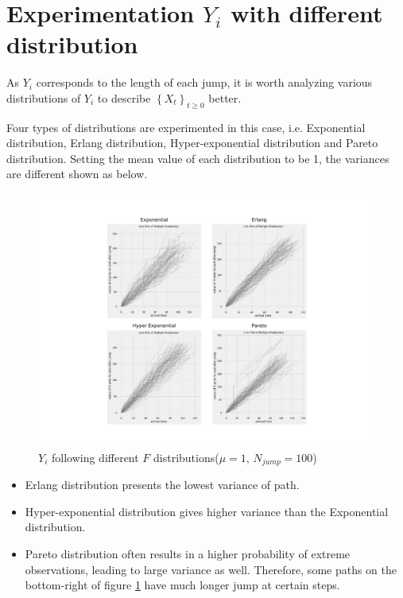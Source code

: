 \section{Experimentation $Y_i$ with different distribution}

As $Y_i$ corresponds to the length of each jump, it is worth analyzing various distributions of $Y_i$ to describe $\left\{X_{t}\right\}_{t \geq 0}$ better.

Four types of distributions are experimented in this case, i.e. Exponential distribution, Erlang distribution, Hyper-exponential distribution and Pareto distribution.
Setting the mean value of each distribution to be 1, the variances are different shown as below. 

\begin{figure}[H]
    \centering
    \includegraphics[scale = 0.9]{figures/task4.pdf}
    \caption{$Y_{i}$ following different $F$ distributions($\mu = 1$, $N_{jump} = 100$)}
    \label{fig:task4}
\end{figure}

\begin{itemize}
    \item Erlang distribution presents the lowest variance of path.
    \item Hyper-exponential distribution gives higher variance than the Exponential distribution.
    \item Pareto distribution often results in a higher probability of extreme observations, leading to large variance as well. Therefore, some paths on the bottom-right of figure \ref{fig:task4} have much longer jump at certain steps.
\end{itemize}

